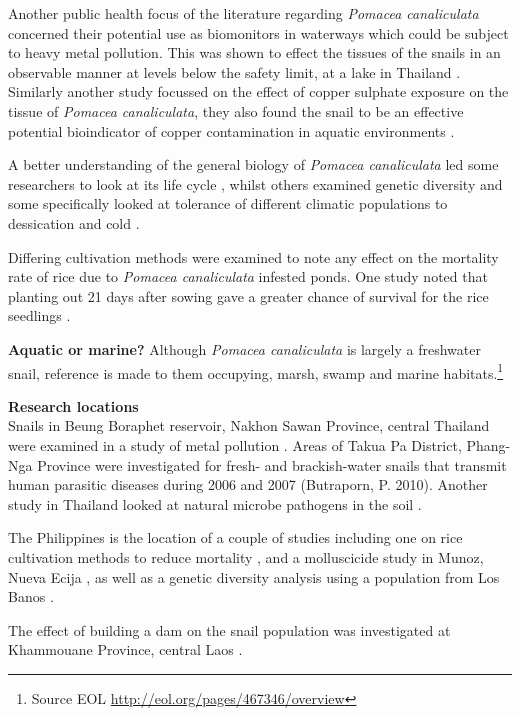 \documentclass[openany]{book}
\let\rmarkdownfootnote\footnote%
\def\footnote{\protect\rmarkdownfootnote}
\theoremstyle{definition}
\theoremstyle{definition}
\theoremstyle{definition}
\theoremstyle{remark}
\begin{document}
Another public health focus of the literature regarding \emph{Pomacea
canaliculata} concerned their potential use as biomonitors in waterways
which could be subject to heavy metal pollution. This was shown to
effect the tissues of the snails in an observable manner at levels below
the safety limit, at a lake in Thailand \citep{Dummee_2012}. Similarly
another study focussed on the effect of copper sulphate exposure on the
tissue of \emph{Pomacea canaliculata}, they also found the snail to be
an effective potential bioindicator of copper contamination in aquatic
environments \citep{Dummee_2015}.

A better understanding of the general biology of \emph{Pomacea
canaliculata} led some researchers to look at its life cycle
\citep{Arfan_2015}, whilst others examined genetic diversity
\citep{Bai_2011} and some specifically looked at tolerance of different
climatic populations to dessication and cold \citep{Wada_2011}.

Differing cultivation methods were examined to note any effect on the
mortality rate of rice due to \emph{Pomacea canaliculata} infested
ponds. One study noted that planting out 21 days after sowing gave a
greater chance of survival for the rice seedlings \citep{Horgan_2014}.

\textbf{Aquatic or marine?} Although \emph{Pomacea canaliculata} is
largely a freshwater snail, reference is made to them occupying, marsh,
swamp and marine habitats.\footnote{Source EOL
  \url{http://eol.org/pages/467346/overview}}

\textbf{Research locations}\\
Snails in Beung Boraphet reservoir, Nakhon Sawan Province, central
Thailand were examined in a study of metal pollution
\citep{Dummee_2012}. Areas of Takua Pa District, Phang-Nga Province were
investigated for fresh- and brackish-water snails that transmit human
parasitic diseases during 2006 and 2007 (Butraporn, P. 2010). Another
study in Thailand looked at natural microbe pathogens in the soil
\citep{Chobchuenchom_2003}.

The Philippines is the location of a couple of studies including one on
rice cultivation methods to reduce mortality \citep{Horgan_2014}, and a
molluscicide study in Munoz, Nueva Ecija \citep{De_La_Cruz_2001}, as
well as a genetic diversity analysis using a population from Los Banos
\citep{Bai_2011}.

The effect of building a dam on the snail population was investigated at
Khammouane Province, central Laos \citep{Brey_2015}.
\end{document}
